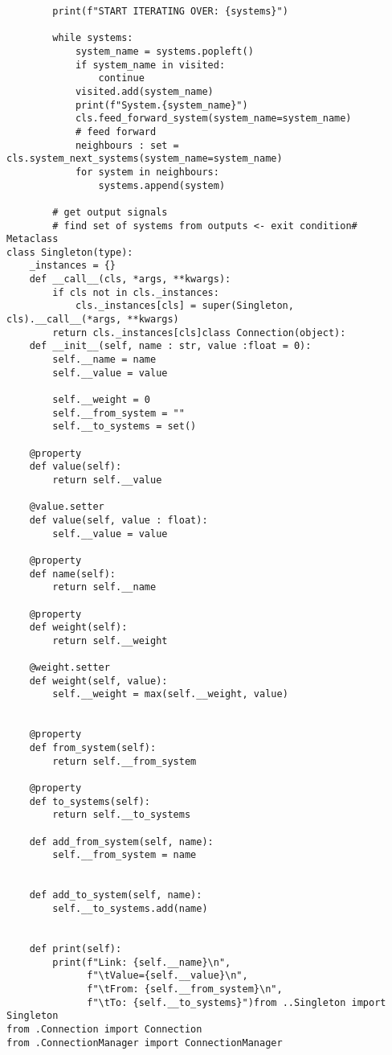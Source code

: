 \begin{verbatim}
        print(f"START ITERATING OVER: {systems}")
        
        while systems:
            system_name = systems.popleft()
            if system_name in visited:
                continue
            visited.add(system_name)
            print(f"System.{system_name}")
            cls.feed_forward_system(system_name=system_name)
            # feed forward
            neighbours : set = cls.system_next_systems(system_name=system_name)
            for system in neighbours:
                systems.append(system)
        
        # get output signals
        # find set of systems from outputs <- exit condition# Metaclass
class Singleton(type):
    _instances = {}
    def __call__(cls, *args, **kwargs):
        if cls not in cls._instances:
            cls._instances[cls] = super(Singleton, cls).__call__(*args, **kwargs)
        return cls._instances[cls]class Connection(object):
    def __init__(self, name : str, value :float = 0):
        self.__name = name
        self.__value = value
        
        self.__weight = 0
        self.__from_system = ""
        self.__to_systems = set()
    
    @property
    def value(self):
        return self.__value

    @value.setter
    def value(self, value : float):
        self.__value = value
    
    @property
    def name(self):
        return self.__name

    @property
    def weight(self):
        return self.__weight
    
    @weight.setter
    def weight(self, value):
        self.__weight = max(self.__weight, value)
    
    
    @property
    def from_system(self):
        return self.__from_system
    
    @property
    def to_systems(self):
        return self.__to_systems
    
    def add_from_system(self, name):
        self.__from_system = name
        
        
    def add_to_system(self, name):
        self.__to_systems.add(name)
        
        
    def print(self):
        print(f"Link: {self.__name}\n",
              f"\tValue={self.__value}\n",
              f"\tFrom: {self.__from_system}\n",
              f"\tTo: {self.__to_systems}")from ..Singleton import Singleton
from .Connection import Connection
from .ConnectionManager import ConnectionManager


\end{verbatim}

